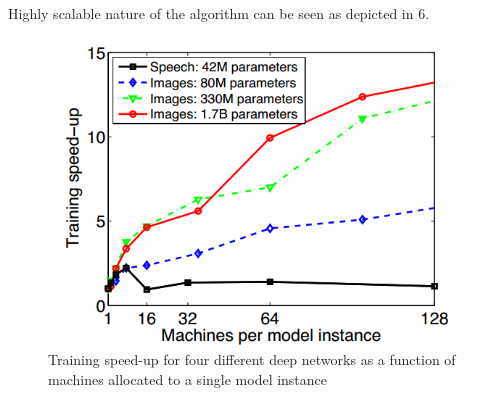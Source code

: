 Highly scalable nature of the algorithm can be seen as depicted in \figurename{6}.
\begin{figure}[h]
	\begin{center}
		\includegraphics[scale=0.4]{img/downpour-sgd.png}
		\caption{Training speed-up for four different deep networks as a function of machines allocated to a single model instance}\label{6}
	\end{center}
\end{figure}